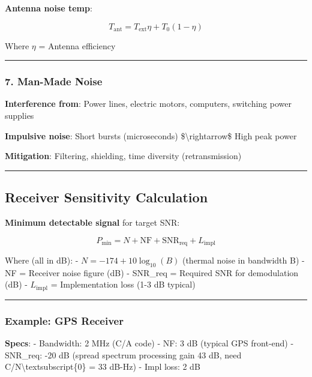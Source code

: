 \textbf{Antenna noise temp}:

\[
T_{\text{ant}} = T_{\text{ext}} \eta + T_0 (1 - \eta)
\]

Where \(\eta\) = Antenna efficiency

\begin{center}\rule{0.5\linewidth}{0.5pt}\end{center}

\subsubsection{7. Man-Made Noise}\label{man-made-noise}

\textbf{Interference from}: Power lines, electric motors, computers,
switching power supplies

\textbf{Impulsive noise}: Short bursts (microseconds)
\$\textbackslash rightarrow\$ High peak power

\textbf{Mitigation}: Filtering, shielding, time diversity
(retransmission)

\begin{center}\rule{0.5\linewidth}{0.5pt}\end{center}

\subsection{Receiver Sensitivity
Calculation}\label{receiver-sensitivity-calculation}

\textbf{Minimum detectable signal} for target SNR:

\[
P_{\text{min}} = N + \text{NF} + \text{SNR}_{\text{req}} + L_{\text{impl}}
\]

Where (all in dB): - \(N = -174 + 10\log_{10}(B)\) (thermal noise in
bandwidth B) - NF = Receiver noise figure (dB) - SNR\_req = Required SNR
for demodulation (dB) - \(L_{\text{impl}}\) = Implementation loss (1-3
dB typical)

\begin{center}\rule{0.5\linewidth}{0.5pt}\end{center}

\subsubsection{Example: GPS Receiver}\label{example-gps-receiver}

\textbf{Specs}: - Bandwidth: 2 MHz (C/A code) - NF: 3 dB (typical GPS
front-end) - SNR\_req: -20 dB (spread spectrum processing gain 43 dB,
need C/N\textbackslash textsubscript\{0\} = 33 dB-Hz) - Impl loss: 2 dB

